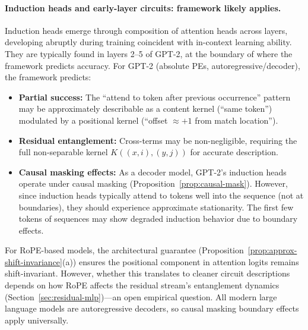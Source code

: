 \documentclass[11pt]{article}
\theoremstyle{definition}
\begin{document}
\paragraph{Induction heads and early-layer circuits: framework likely applies.}
Induction heads \cite{olsson2022induction} emerge through composition of attention heads across layers, developing abruptly during training coincident with in-context learning ability. They are typically found in layers 2--5 of GPT-2, at the boundary of where the framework predicts accuracy. For GPT-2 (absolute PEs, autoregressive/decoder), the framework predicts:
\begin{itemize}
    \item \textbf{Partial success:} The ``attend to token after previous occurrence'' pattern may be approximately describable as a content kernel (``same token'') modulated by a positional kernel (``offset $\approx +1$ from match location'').
    \item \textbf{Residual entanglement:} Cross-terms may be non-negligible, requiring the full non-separable kernel $K((x,i),(y,j))$ for accurate description.
    \item \textbf{Causal masking effects:} As a decoder model, GPT-2's induction heads operate under causal masking (Proposition~\ref{prop:causal-mask}). However, since induction heads typically attend to tokens well into the sequence (not at boundaries), they should experience approximate stationarity. The first few tokens of sequences may show degraded induction behavior due to boundary effects.
\end{itemize}
For RoPE-based models, the architectural guarantee (Proposition~\ref{prop:approx-shift-invariance}(a)) ensures the positional component in attention logits remains shift-invariant. However, whether this translates to cleaner circuit descriptions depends on how RoPE affects the residual stream's entanglement dynamics (Section~\ref{sec:residual-mlp})---an open empirical question. All modern large language models are autoregressive decoders, so causal masking boundary effects apply universally.
\end{document}
